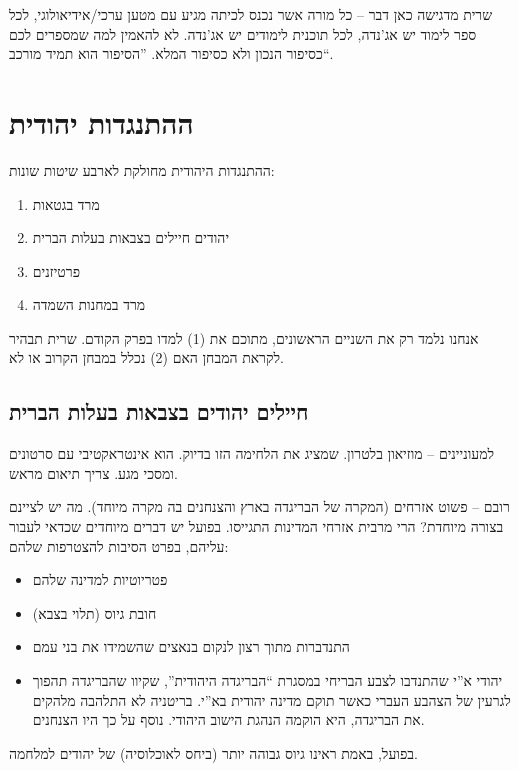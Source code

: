 \documentclass[a4paper]{book}
\begin{document}
	שרית מדגישה כאן דבר – כל מורה אשר נכנס לכיתה מגיע עם מטען ערכי/אידיאולוגי, לכל ספר לימוד יש אג'נדה, לכל תוכנית לימודים יש אג'נדה. לא להאמין למה שמספרים לכם כסיפור הנכון ולא כסיפור המלא. ''הסיפור הוא תמיד מורכב``. 
	
	\section{ההתנגדות יהודית}
	ההתנגדות היהודית מחולקת לארבע שיטות שונות: 
	\begin{enumerate}
		\item מרד בגטאות
		\item יהודים חיילים בצבאות בעלות הברית
		\item פרטיזנים
		\item מרד במחנות השמדה
	\end{enumerate}
	אנחנו נלמד רק את השניים הראשונים, מתוכם את (1) למדו בפרק הקודם. שרית תבהיר לקראת המבחן האם (2) נכלל במבחן הקרוב או לא. 
	
	\subsection{חיילים יהודים בצבאות בעלות הברית}
	למעוניינים – מוזיאון בלטרון. שמציג את הלחימה הזו בדיוק. הוא אינטראקטיבי עם סרטונים ומסכי מגע. צריך תיאום מראש. 
	
	רובם – פשוט אזרחים (המקרה של הבריגדה בארץ והצנחנים בה מקרה מיוחד). מה יש לציינם בצורה מיוחדת? הרי מרבית אזרחי המדינות התגייסו. בפועל יש דברים מיוחדים שכדאי לעבור עליהם, בפרט הסיבות להצטרפות שלהם: 
	\begin{itemize}
		\item פטריוטיות למדינה שלהם
		\item חובת גיוס (תלוי בצבא)
		\item התנדברות מתוך רצון לנקום בנאצים שהשמידו את בני עמם
		\item יהודי א''י שהתנדבו לצבע הבריחי במסגרת ``הבריגדה היהודית'', שקיוו שהבריגדה תהפוך לגרעין של הצהבע העברי כאשר תוקם מדינה יהודית בא''י. בריטניה לא התלהבה מלהקים את הבריגדה, היא הוקמה הנהגת הישוב היהודי. נוסף על כך היו הצנחנים. 
		
		
	\end{itemize}
	
	בפועל, באמת ראינו גיוס גבוהה יותר (ביחס לאוכלוסיה) של יהודים למלחמה. 
	
\end{document}
